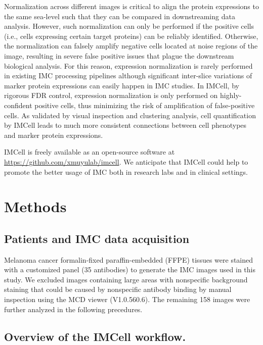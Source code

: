 \documentclass{mynature}
\begin{document}
Normalization across different images is critical to align the protein expressions to the same sea-level such that they can be compared in downstreaming data analysis. 
However, such normalization can only be performed if the positive cells (i.e., cells expressing certain target proteins) can be reliably identified.  Otherwise, the normalization can falsely amplify negative cells located at noise regions of the image, resulting in severe false positive issues that plague the downstream biological analysis.  For this reason, expression normalization is rarely performed in existing IMC processing pipelines although significant inter-slice variations of marker protein expressions can easily happen in IMC studies. In IMCell, by rigorous FDR control, expression normalization is only performed on highly-confident positive cells, thus minimizing the risk of amplification of false-positive cells. As validated by visual inspection and clustering analysis, cell quantification by IMCell leads to much more consistent connections between cell phenotypes and marker protein expressions.  

IMCell is freely available as an open-source software at \url{https://github.com/xmuyulab/imcell}. We anticipate that IMCell could help to promote the better usage of IMC both in research labs and in clinical settings. 

\section{Methods}

\subsection{Patients and IMC data acquisition}

Melanoma cancer formalin-fixed paraffin-embedded (FFPE) tissues were stained with a customized panel (35 antibodies) to generate the IMC images used in this study. 
We excluded images containing large areas with nonspecific background staining that could be caused by nonspecific antibody binding \cite{buchwalow2011non} by manual inspection using the MCD viewer (V1.0.560.6). The remaining 158 images were further analyzed in the following precedures.  


\subsection{Overview of the IMCell workflow.}
\end{document}
